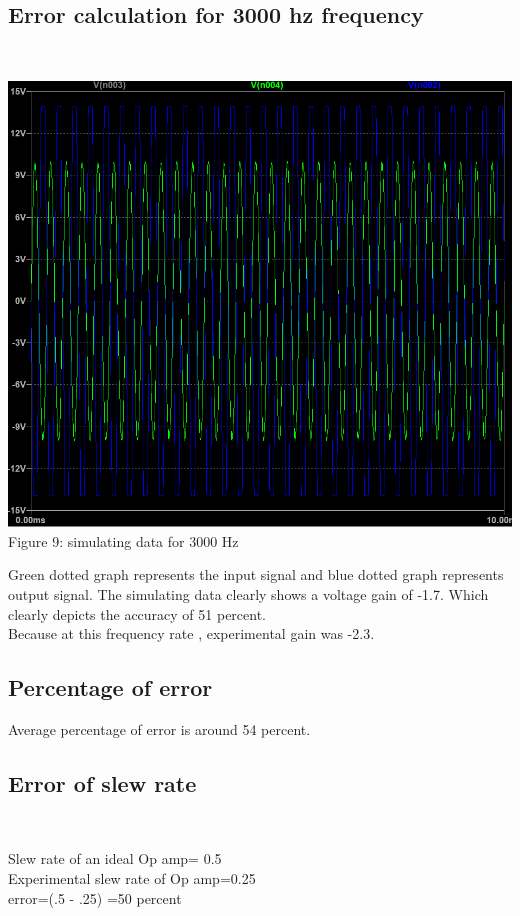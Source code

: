 \documentclass[12pt]{article}
\begin{document}
\subsection{Error calculation for 3000 hz frequency}\\
[1cm]
\begin{center}
    \includegraphics[scale=.4]{3khz_lab1.png}\\
    \caption{Figure 9: simulating data for 3000 Hz}
\end{center}
Green dotted graph represents the input signal and blue dotted graph represents output signal. The simulating data clearly shows a voltage gain of -1.7. Which clearly depicts the accuracy of 51 percent.\\
Because at this frequency rate , experimental gain was -2.3.\\
\subsection{Percentage of error}
Average percentage of error is around 54 percent.\\
\subsection{Error of slew rate}\\
\begin{center}
    Slew rate of an ideal Op amp= 0.5\\
    Experimental slew rate of Op amp=0.25\\
    error=(.5 - .25) =50 percent \\
\end{center}
\end{document}
